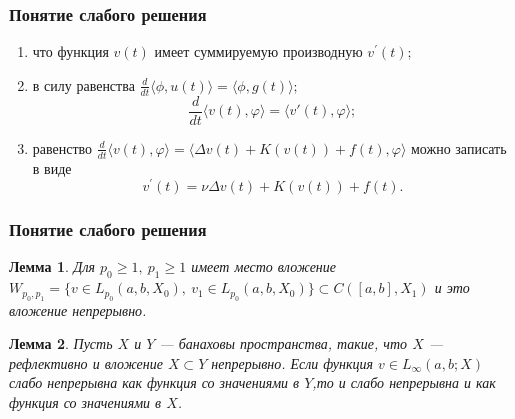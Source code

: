 \documentclass[10pt, pdf, hyperref={unicode}]{beamer}
\newtheorem{ru_lemma}{Лемма}
\renewenvironment{lemma}{\begin{ru_lemma}}{\end{ru_lemma}}
\begin{document}
    \begin{frame}
    \frametitle{Понятие слабого решения}
    \begin{center}
      \begin{minipage}[h]{0.97\linewidth}
      \begin{enumerate}
      \item что функция $v(t)$ имеет суммируемую производную $v^\prime(t);$
      \item в силу равенства $\frac{d}{dt}\langle \phi, u(t) \rangle = \langle \phi, g(t) \rangle;$
      $$\frac{d}{dt} \langle v(t), \varphi \rangle = \langle v'(t), \varphi \rangle;$$
      \item равенство $\frac{d}{dt}\langle v(t), \varphi \rangle=\langle \Delta v(t)+K(v(t))+f(t),\varphi\rangle$ можно записать в виде
      $$v^\prime(t)=\nu\Delta v(t)+K(v(t))+f(t).$$
      \end{enumerate}
      \end{minipage}
    \end{center}
  \end{frame}

    \begin{frame}
    \frametitle{Понятие слабого решения}
    \begin{center}
      \begin{minipage}[h]{0.97\linewidth}
        \begin{lemma}
          Для $p_0\ge 1, \ p_1\ge 1$ имеет место вложение\linebreak
          $W_{p_0,p_1}=\{v\in L_{p_0}(a,b,X_0), \ v_1\in L_{p_0}(a,b,X_0)\}\subset C([a,b],X_1)$
          и это вложение непрерывно.
        \end{lemma}
        \begin{lemma}
          Пусть $X$ и $Y$ --- банаховы пространства, такие, что $X$ --- рефлективно и вложение $X\subset Y$ непрерывно.
          Если функция $v\in L_{\infty}(a,b;X)$ слабо непрерывна как функция со значениями в $Y$,то и слабо непрерывна и как функция со значениями в $X$.
        \end{lemma}
      \end{minipage}
    \end{center}
  \end{frame}
\end{document}
